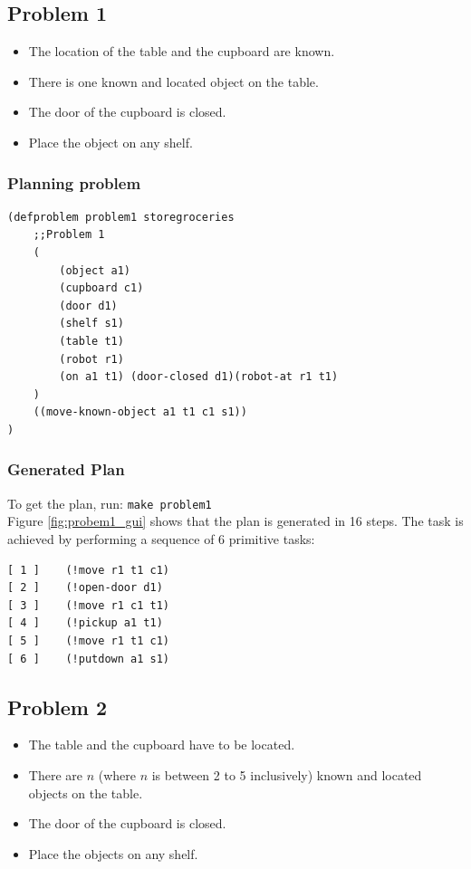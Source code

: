 \documentclass[paper=a4, fontsize=11pt]{scrartcl}
\begin{document}
	\subsection{Problem 1}

	\begin{itemize}
		\item The location of the table and the cupboard are known.
		\item There is one known and located object on the table.
		\item The door of the cupboard is closed.
		\item Place the object on any shelf.
	\end{itemize}

	\newpage

	\subsubsection*{Planning problem}

	\begin{lstlisting}
(defproblem problem1 storegroceries
	;;Problem 1
	(
		(object a1)
		(cupboard c1)
		(door d1)
		(shelf s1)
		(table t1)
		(robot r1)
		(on a1 t1) (door-closed d1)(robot-at r1 t1)
	)
	((move-known-object a1 t1 c1 s1))
)
	\end{lstlisting}

	\subsubsection*{Generated Plan}

	To get the plan, run: \verb|make problem1| \\

	Figure \ref{fig:probem1_gui} shows that the plan is generated in 16 steps. The task is achieved by performing a sequence of 6 primitive tasks: \\

	\begin{lstlisting}
[ 1 ]    (!move r1 t1 c1)
[ 2 ]    (!open-door d1)
[ 3 ]    (!move r1 c1 t1)
[ 4 ]    (!pickup a1 t1)
[ 5 ]    (!move r1 t1 c1)
[ 6 ]    (!putdown a1 s1)
	\end{lstlisting}

	\subsection{Problem 2}

	\begin{itemize}
		\item The table and the cupboard have to be located.
        \item There are $n$ (where $n$ is between 2 to 5 inclusively) known and located objects on the table.
		\item The door of the cupboard is closed.
		\item Place the objects on any shelf.
	\end{itemize}
\end{document}
